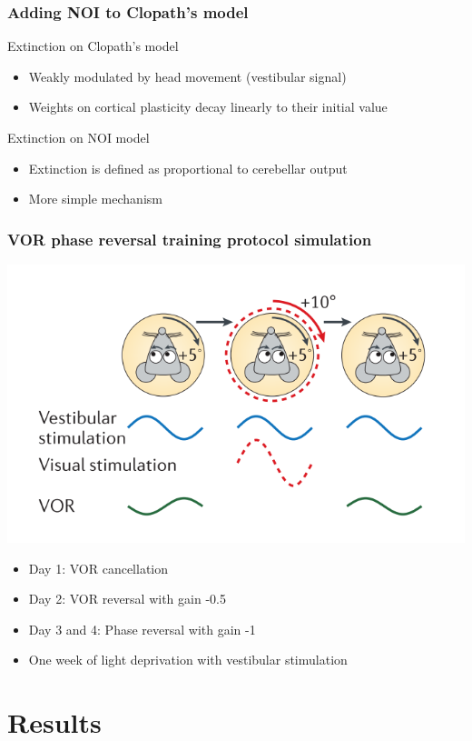 \documentclass[10pt, compress]{beamer}
\begin{document}
\begin{frame}[fragile]
  \frametitle{Adding NOI to Clopath's model}
  Extinction on Clopath's model
  \begin{itemize}
    \item Weakly modulated by head movement (vestibular signal)
    \item Weights on cortical plasticity decay linearly to their initial value
  \end{itemize}
  Extinction on NOI model
  \begin{itemize}
    \item \alert{Extinction is defined as proportional to cerebellar output}
    \item More simple mechanism
  \end{itemize}
\end{frame}

\begin{frame}[fragile]
  \frametitle{VOR phase reversal training protocol simulation}
  \includegraphics[scale=0.25]{images/vor_adaptation.png}

  \cite{Gao2012a}
  \begin{itemize}
    \item Day 1: VOR cancellation
    \item Day 2: VOR reversal with gain -0.5
    \item Day 3 and 4: Phase reversal with gain -1
    \pause
    \item One week of light deprivation with vestibular stimulation
  \end{itemize}
\end{frame}

\section{Results}
\end{document}
